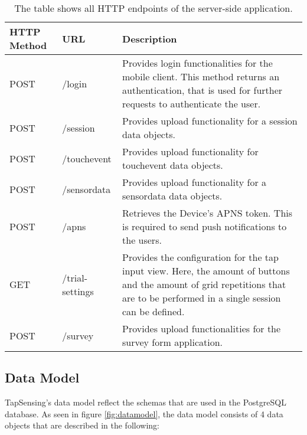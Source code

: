 \begin{table}[h!]
  \begin{longtable}{|p{2cm}|p{4cm}|p{8cm}|}
  \hline
  \textbf{HTTP \newline Method} & \textbf{URL} & \textbf{Description} \\ \hline
  POST & /login & Provides login functionalities for the mobile client. This method returns an authentication, that is used for further requests to authenticate the user.\\
  \hline
  POST & /session & Provides upload functionality for a session data objects.\\
  \hline
  POST & /touchevent & Provides upload functionality for touchevent data objects.\\
  \hline
  POST & /sensordata & Provides upload functionality for a sensordata data objects.\\
  \hline
  POST & /apns & Retrieves the Device's APNS token. This is required to send push notifications to the users.\\
  \hline
  GET & /trial-settings & Provides the configuration for the tap input view. Here, the amount of buttons and the amount of grid repetitions that are to be performed in a single session can be defined.\\
  \hline
  POST & /survey & Provides upload functionalities for the survey form application.\\
  \hline

  \end{longtable}
  \caption{The table shows all HTTP endpoints of the server-side application.}\label{table:endpoints.}
\end{table}

\subsection{Data Model}
TapSensing's data model reflect the schemas that are used in the PostgreSQL database. As seen in figure \ref{fig:datamodel}, the data model consists of 4 data objects that are described in the following:

